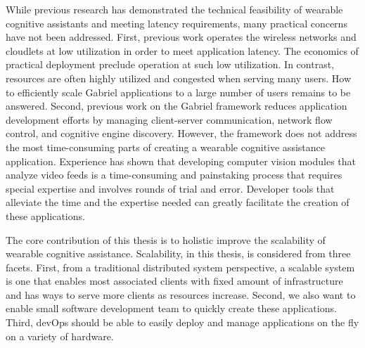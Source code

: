 While previous research has demonstrated the technical feasibility of wearable
cognitive assistants and meeting latency requirements, many practical concerns
have not been addressed. First, previous work operates the wireless networks and
cloudlets at low utilization in order to meet application latency. The economics
of practical deployment preclude operation at such low utilization. In contrast,
resources are often highly utilized and congested when serving many users. How
to efficiently scale Gabriel applications to a large number of users remains to
be answered. Second, previous work on the Gabriel framework reduces application
development efforts by managing client-server communication, network flow
control, and cognitive engine discovery. However, the framework does not address
the most time-consuming parts of creating a wearable cognitive assistance
application. Experience has shown that developing computer vision modules that
analyze video feeds is a time-consuming and painstaking process that requires
special expertise and involves rounds of trial and error. Developer tools that
alleviate the time and the expertise needed can greatly facilitate the creation
of these applications.

The core contribution of this thesis is to holistic improve the scalability of
wearable cognitive assistance. Scalability, in this thesis, is considered from
three facets. First, from a traditional distributed system perspective, a
scalable system is one that enables most associated clients with fixed amount of
infrastructure and has ways to serve more clients as resources increase. Second,
we also want to enable small software development team to quickly create these
applications. Third, devOps should be able to easily deploy and manage
applications on the fly on a variety of hardware.


